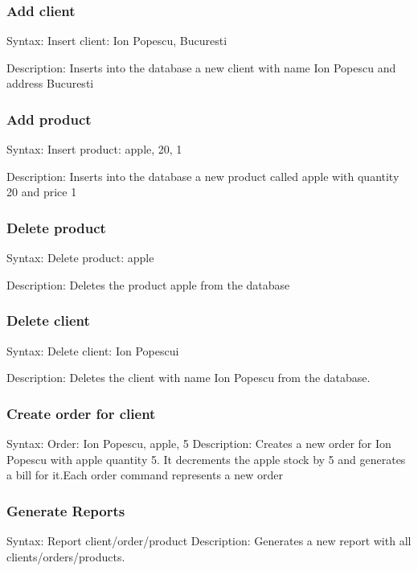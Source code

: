 \documentclass[10pt,a4paper]{article}
\begin{document}
\subsubsection{Add client}
Syntax: Insert client: Ion Popescu, Bucuresti\par
Description: Inserts into the database a new client with name Ion Popescu and address Bucuresti
\subsubsection{Add product}
Syntax: Insert product: apple, 20, 1\par
Description: Inserts into the database a new product called apple with quantity 20 and price 1
\subsubsection{Delete product}
Syntax: Delete product: apple\par
Description: Deletes the product apple from the database
\subsubsection{Delete client}
Syntax: Delete client: Ion Popescui\par
Description: Deletes the client with name Ion Popescu from the database.
\subsubsection{Create order for client}
Syntax: Order: Ion Popescu, apple, 5
Description: Creates a new order for Ion Popescu with apple quantity 5. It decrements the apple stock by 5 and generates a bill for it.Each order command represents a new order
\subsubsection{Generate Reports}
Syntax: Report client/order/product
Description: Generates a new report with all clients/orders/products.
\pagebreak
\end{document}

